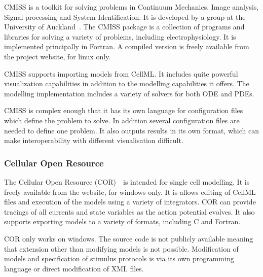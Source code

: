 CMISS is a toolkit for solving problems in Continuum Mechanics, Image analysis,
Signal processing and System Identification.
It is developed by a group at the University of Auckland~\cite{CMISS}.
The CMISS package is a collection of programs and libraries for solving a
variety of problems, including electrophysiology.
It is implemented principally in Fortran.
A compiled version is freely available from the project website, for linux only.

CMISS supports importing models from CellML.
It includes quite powerful visualization capabilities in addition to the
modelling capabilities it offers.
The modelling implementation includes a variety of solvers for both ODE and
PDEs.

CMISS is complex enough that it has its own language for configuration files
which define the problem to solve.
In addition several configuration files are needed to define one problem.
It also outputs results in its own format, which can make interoperability
with different visualisation difficult.

\subsubsection{Cellular Open Resource}

The Cellular Open Resource (COR)~\cite{Garny2003}\ is intended for single cell
modelling.
It is freely available from the website, for windows only.
It is allows editing of CellML files and execution of the models using a variety
of integrators.
COR can provide tracings of all currents and state variables as the action
potential evolves.
It also supports exporting models to a variety of formats, including C and
Fortran.

COR only works on windows.
The source code is not publicly available meaning that extension other than
modifying models is not possible.
Modification of models and specification of stimulus protocols is via its own
programming language or direct modification of XML files.
